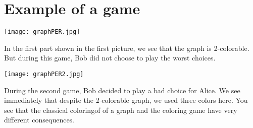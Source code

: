 \section{Example of a game}


\texttt{[image: graphPER.jpg]}

In the first part shown in the first picture, we see that the graph is 2-colorable. But during this game, Bob did not choose to play the worst choices.

\texttt{[image: graphPER2.jpg]}

During the second game, Bob decided to play a bad choice for Alice. We see immediately that despite the 2-colorable graph, we used three colors here. You see that the classical coloringof of a graph and the coloring game have very different consequences.